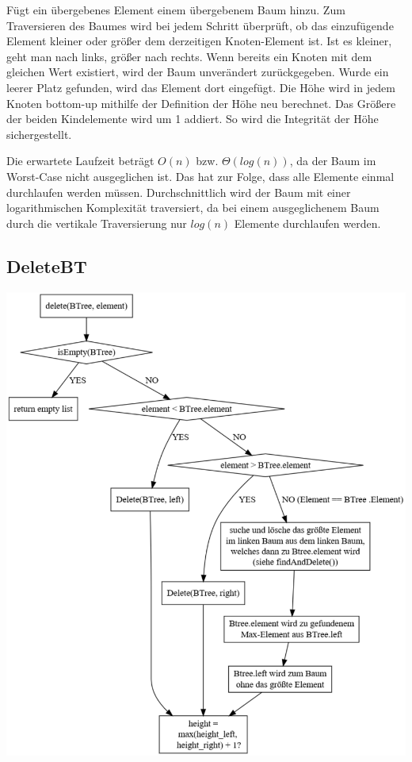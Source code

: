\documentclass[11pt]{article}
\begin{document}
    Fügt ein übergebenes Element einem übergebenem Baum hinzu.
    Zum Traversieren des Baumes wird bei jedem Schritt überprüft,
    ob das einzufügende Element kleiner oder größer dem derzeitigen Knoten-Element ist.
    Ist es kleiner, geht man nach links, größer nach rechts.
    Wenn bereits ein Knoten mit dem gleichen Wert existiert, wird der Baum
    unverändert zurückgegeben.
    Wurde ein leerer Platz gefunden, wird das Element dort eingefügt.
    Die Höhe wird in jedem Knoten bottom-up mithilfe der Definition der Höhe neu berechnet.
    Das Größere der beiden Kindelemente wird um 1 addiert.
    So wird die Integrität der Höhe sichergestellt.


    Die erwartete Laufzeit beträgt
    \begin{math}
        O(n)
    \end {math}
    bzw.
    \begin{math}
        \Theta (log (n))
    \end{math},
    da der Baum im Worst-Case nicht ausgeglichen ist.
    Das hat zur Folge, dass alle Elemente einmal durchlaufen werden müssen.
    Durchschnittlich wird der Baum mit einer logarithmischen Komplexität
    traversiert, da bei einem ausgeglichenem Baum durch die vertikale
    Traversierung nur
    \begin{math}
        log (n)
    \end{math}
    Elemente durchlaufen werden.

    \subsection{DeleteBT}\label{subsec:deletebt}

    \begin{center}
        \includegraphics[width=0.8\columnwidth] {delete.pdf}
    \end{center}
\end{document}
